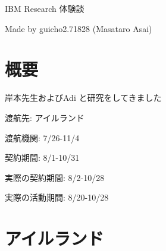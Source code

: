 \begin{outline-text-1}
\begin{xlarge}
\begin{center}
IBM Research 体験談
\end{center}
\end{xlarge}

\begin{note}
\begin{alignright}
Made by guicho2.71828 (Masataro Asai)
\end{alignright}
\end{note}
\end{outline-text-1}

\section{概要}
\label{sec-1}

岸本先生およびAdi と研究をしてきました

渡航先: アイルランド

渡航機関: 7/26-11/4

契約期間: 8/1-10/31

実際の契約期間: 8/2-10/28

実際の活動期間: 8/20-10/28

\section{アイルランド}
\label{sec-2}

